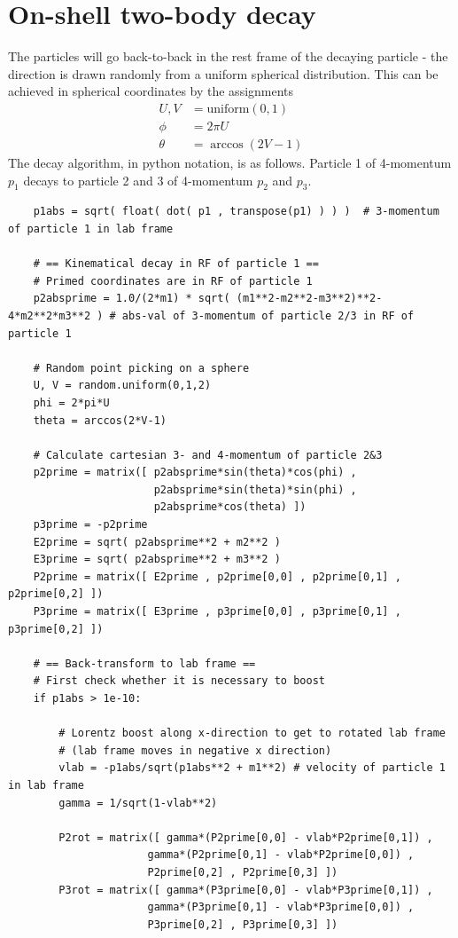 \documentclass[twoside,english]{uiofysmaster}
\begin{document}
\section{On-shell two-body decay}
\label{sec:decayalgorithm}
 The particles will go back-to-back in the rest frame of the decaying particle - the direction is drawn randomly from a uniform spherical distribution. This can be achieved in spherical coordinates by the assignments
\begin{align}
	U, V &= \text{uniform}(0,1)\nonumber \\
	\phi &= 2\pi U\\
	\theta &= \arccos(2V-1) \nonumber
\end{align}
The decay algorithm, in python notation, is as follows. Particle 1 of 4-momentum $p_1$ decays to particle 2 and 3 of 4-momentum $p_2$ and $p_3$. 
\begin{lstlisting}
	p1abs = sqrt( float( dot( p1 , transpose(p1) ) ) )  # 3-momentum of particle 1 in lab frame

	# == Kinematical decay in RF of particle 1 ==
	# Primed coordinates are in RF of particle 1
	p2absprime = 1.0/(2*m1) * sqrt( (m1**2-m2**2-m3**2)**2- 4*m2**2*m3**2 ) # abs-val of 3-momentum of particle 2/3 in RF of particle 1

	# Random point picking on a sphere
	U, V = random.uniform(0,1,2) 
	phi = 2*pi*U 				  
	theta = arccos(2*V-1) 		 

	# Calculate cartesian 3- and 4-momentum of particle 2&3
	p2prime = matrix([ p2absprime*sin(theta)*cos(phi) , 
					   p2absprime*sin(theta)*sin(phi) , 
				   	   p2absprime*cos(theta) ])
	p3prime = -p2prime
	E2prime = sqrt( p2absprime**2 + m2**2 )
	E3prime = sqrt( p2absprime**2 + m3**2 )
	P2prime = matrix([ E2prime , p2prime[0,0] , p2prime[0,1] , p2prime[0,2] ])
	P3prime = matrix([ E3prime , p3prime[0,0] , p3prime[0,1] , p3prime[0,2] ])

	# == Back-transform to lab frame ==
	# First check whether it is necessary to boost
	if p1abs > 1e-10:

		# Lorentz boost along x-direction to get to rotated lab frame
		# (lab frame moves in negative x direction)
	 	vlab = -p1abs/sqrt(p1abs**2 + m1**2) # velocity of particle 1 in lab frame
		gamma = 1/sqrt(1-vlab**2)

		P2rot = matrix([ gamma*(P2prime[0,0] - vlab*P2prime[0,1]) , 
				      gamma*(P2prime[0,1] - vlab*P2prime[0,0]) ,
				      P2prime[0,2] , P2prime[0,3] ])
		P3rot = matrix([ gamma*(P3prime[0,0] - vlab*P3prime[0,1]) , 
				      gamma*(P3prime[0,1] - vlab*P3prime[0,0]) ,
				      P3prime[0,2] , P3prime[0,3] ])


\end{lstlisting}
\end{document}
